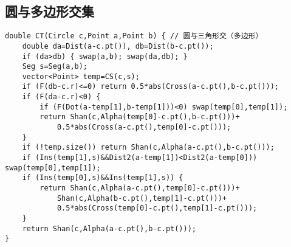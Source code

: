 \documentclass{article}
\begin{document}
\subsection{圆与多边形交集}
\begin{lstlisting}
double CT(Circle c,Point a,Point b) { // 圆与三角形交（多边形）
	double da=Dist(a-c.pt()), db=Dist(b-c.pt());
	if (da>db) { swap(a,b); swap(da,db); }
	Seg s=Seg(a,b);
	vector<Point> temp=CS(c,s);
	if (F(db-c.r)<=0) return 0.5*abs(Cross(a-c.pt(),b-c.pt()));
	if (F(da-c.r)<0) {
		if (F(Dot(a-temp[1],b-temp[1]))<0) swap(temp[0],temp[1]);
		return Shan(c,Alpha(temp[0]-c.pt(),b-c.pt()))+
			0.5*abs(Cross(a-c.pt(),temp[0]-c.pt()));
	}
	if (!temp.size()) return Shan(c,Alpha(a-c.pt(),b-c.pt()));
	if (Ins(temp[1],s)&&Dist2(a-temp[1])<Dist2(a-temp[0])) swap(temp[0],temp[1]);
	if (Ins(temp[0],s)&&Ins(temp[1],s)) {
		return Shan(c,Alpha(a-c.pt(),temp[0]-c.pt()))+
			Shan(c,Alpha(b-c.pt(),temp[1]-c.pt()))+
			0.5*abs(Cross(temp[0]-c.pt(),temp[1]-c.pt()));
	}
	return Shan(c,Alpha(a-c.pt(),b-c.pt()));
}
\end{lstlisting}
\end{document}
